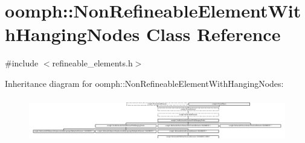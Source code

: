 \hypertarget{classoomph_1_1NonRefineableElementWithHangingNodes}{}\section{oomph\+:\+:Non\+Refineable\+Element\+With\+Hanging\+Nodes Class Reference}
\label{classoomph_1_1NonRefineableElementWithHangingNodes}


{\ttfamily \#include $<$refineable\+\_\+elements.\+h$>$}

Inheritance diagram for oomph\+:\+:Non\+Refineable\+Element\+With\+Hanging\+Nodes\+:\begin{figure}[H]
\begin{center}
\leavevmode
\includegraphics[height=1.948310cm]{classoomph_1_1NonRefineableElementWithHangingNodes}
\end{center}
\end{figure}
